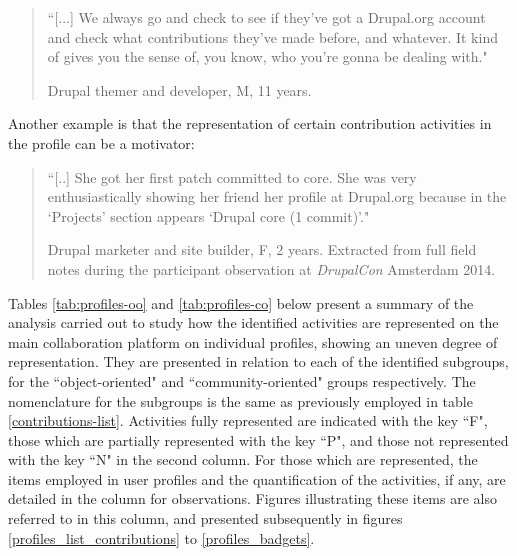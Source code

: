 \begin{quotation}
    ``[...] We always go and check to see if they've got a Drupal.org account and check what contributions they've made before, and whatever. It kind of gives you the sense of, you know, who you're gonna be dealing with."

\begin{flushright}\footnotesize{Drupal themer and developer, M, 11 years.}\end{flushright}
\end{quotation}

Another example is that the representation of certain contribution activities in the profile  can be a motivator:

\begin{quotation}
    ``[..] She got her first patch committed to core. She was very enthusiastically showing her friend her profile at Drupal.org because in the `Projects' section appears `Drupal core (1 commit)'."

\begin{flushright}\footnotesize{Drupal marketer and site builder, F, 2 years. Extracted from full field notes during the participant observation at \textit{DrupalCon} Amsterdam 2014.}\end{flushright}
\end{quotation}

Tables \ref{tab:profiles-oo} and \ref{tab:profiles-co} below present a summary of the analysis carried out to study how the identified activities are represented on the main collaboration platform on individual profiles, showing an uneven degree of representation. They are presented in relation to each of the identified subgroups, for the ``object-oriented" and ``community-oriented" groups respectively. The nomenclature for the subgroups is the same as previously employed in table \ref{contributions-list}. Activities fully represented are indicated with the key ``F", those which are partially represented with the key ``P", and those not represented with the key ``N" in the second column. For those which are represented, the items employed in user profiles and the quantification of the activities, if any, are detailed in the column for observations. Figures illustrating these items are also referred to in this column, and presented subsequently in figures \ref{profiles_list_contributions} to \ref{profiles_badgets}.

